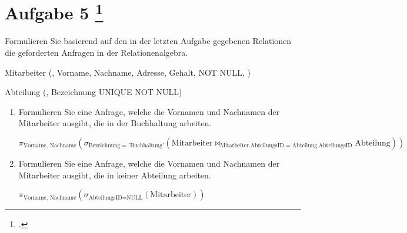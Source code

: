 \documentclass{lehramt-informatik-aufgabe}
\begin{document}
\section{Aufgabe 5
\footcite{66116:2021:03}}

Formulieren Sie basierend auf den in der letzten Aufgabe gegebenen
Relationen die geforderten Anfragen in der Relationenalgebra.

\begin{liRmodell}
Mitarbeiter (, Vorname, Nachname, Adresse,
Gehalt,  NOT NULL, )

\bigskip

Abteilung (, Bezeichnung UNIQUE NOT NULL)
\end{liRmodell}

\begin{enumerate}






\item Formulieren Sie eine Anfrage, welche die Vornamen und Nachnamen
der Mitarbeiter ausgibt, die in der Buchhaltung arbeiten.

\begin{liAntwort}
$\pi_{\text{Vorname, Nachname}}(
  \sigma_{\text{Bezeichnung = 'Buchhaltung'}}(
    \text{Mitarbeiter}
    \bowtie_{\text{Mitarbeiter.AbteilungsID = Abteilung.AbteilungsID}}
    \text{Abteilung}
  )
)
$
\end{liAntwort}


\item Formulieren Sie eine Anfrage, welche die Vornamen und Nachnamen
der Mitarbeiter ausgibt, die in keiner Abteilung arbeiten.


\begin{liAntwort}
$
\pi_{\text{Vorname, Nachname}}(
  \sigma_{\text{AbteilungsID} = \text{NULL}}(\text{Mitarbeiter})
)
$
\end{liAntwort}
\end{enumerate}
\end{document}
